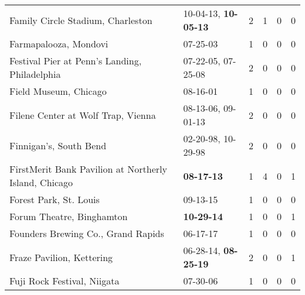 \begin{longtable}{p{}p{}p{}p{}p{}p{}}
                                            Family Circle Stadium, Charleston &           10-04-13\textsuperscript{}, \textbf{10-05-13\textsuperscript{}} &  2 &  1 &  0 &  0 \\
                                                        Farmapalooza, Mondovi &                                                07-25-03\textsuperscript{} &  1 &  0 &  0 &  0 \\
                                Festival Pier at Penn's Landing, Philadelphia &                    07-22-05\textsuperscript{}, 07-25-08\textsuperscript{} &  2 &  0 &  0 &  0 \\
                                                        Field Museum, Chicago &                                                08-16-01\textsuperscript{} &  1 &  0 &  0 &  0 \\
                                           Filene Center at Wolf Trap, Vienna &                    08-13-06\textsuperscript{}, 09-01-13\textsuperscript{} &  2 &  0 &  0 &  0 \\
                                                       Finnigan's, South Bend &                    02-20-98\textsuperscript{}, 10-29-98\textsuperscript{} &  2 &  0 &  0 &  0 \\
                        FirstMerit Bank Pavilion at Northerly Island, Chicago &                                       \textbf{08-17-13\textsuperscript{}} &  1 &  4 &  0 &  1 \\
                                                       Forest Park, St. Louis &                                                09-13-15\textsuperscript{} &  1 &  0 &  0 &  0 \\
                                                    Forum Theatre, Binghamton &                                       \textbf{10-29-14\textsuperscript{}} &  1 &  0 &  0 &  1 \\
                                           Founders Brewing Co., Grand Rapids &                                                06-17-17\textsuperscript{} &  1 &  0 &  0 &  0 \\
                                                    Fraze Pavilion, Kettering &           06-28-14\textsuperscript{}, \textbf{08-25-19\textsuperscript{}} &  2 &  0 &  0 &  1 \\
                                                  Fuji Rock Festival, Niigata &                                                07-30-06\textsuperscript{} &  1 &  0 &  0 &  0 \\

\end{longtable}
